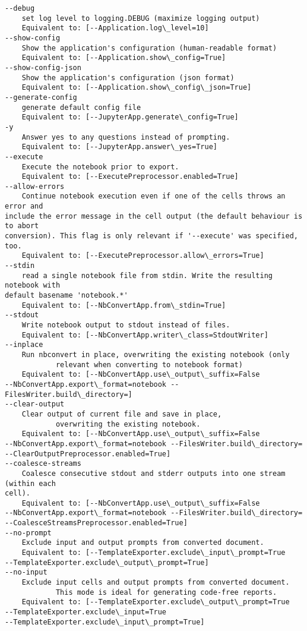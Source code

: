 \documentclass[11pt]{article}
\begin{document}
\begin{Verbatim}[commandchars=\\\{\}]
--debug
    set log level to logging.DEBUG (maximize logging output)
    Equivalent to: [--Application.log\_level=10]
--show-config
    Show the application's configuration (human-readable format)
    Equivalent to: [--Application.show\_config=True]
--show-config-json
    Show the application's configuration (json format)
    Equivalent to: [--Application.show\_config\_json=True]
--generate-config
    generate default config file
    Equivalent to: [--JupyterApp.generate\_config=True]
-y
    Answer yes to any questions instead of prompting.
    Equivalent to: [--JupyterApp.answer\_yes=True]
--execute
    Execute the notebook prior to export.
    Equivalent to: [--ExecutePreprocessor.enabled=True]
--allow-errors
    Continue notebook execution even if one of the cells throws an error and
include the error message in the cell output (the default behaviour is to abort
conversion). This flag is only relevant if '--execute' was specified, too.
    Equivalent to: [--ExecutePreprocessor.allow\_errors=True]
--stdin
    read a single notebook file from stdin. Write the resulting notebook with
default basename 'notebook.*'
    Equivalent to: [--NbConvertApp.from\_stdin=True]
--stdout
    Write notebook output to stdout instead of files.
    Equivalent to: [--NbConvertApp.writer\_class=StdoutWriter]
--inplace
    Run nbconvert in place, overwriting the existing notebook (only
            relevant when converting to notebook format)
    Equivalent to: [--NbConvertApp.use\_output\_suffix=False
--NbConvertApp.export\_format=notebook --FilesWriter.build\_directory=]
--clear-output
    Clear output of current file and save in place,
            overwriting the existing notebook.
    Equivalent to: [--NbConvertApp.use\_output\_suffix=False
--NbConvertApp.export\_format=notebook --FilesWriter.build\_directory=
--ClearOutputPreprocessor.enabled=True]
--coalesce-streams
    Coalesce consecutive stdout and stderr outputs into one stream (within each
cell).
    Equivalent to: [--NbConvertApp.use\_output\_suffix=False
--NbConvertApp.export\_format=notebook --FilesWriter.build\_directory=
--CoalesceStreamsPreprocessor.enabled=True]
--no-prompt
    Exclude input and output prompts from converted document.
    Equivalent to: [--TemplateExporter.exclude\_input\_prompt=True
--TemplateExporter.exclude\_output\_prompt=True]
--no-input
    Exclude input cells and output prompts from converted document.
            This mode is ideal for generating code-free reports.
    Equivalent to: [--TemplateExporter.exclude\_output\_prompt=True
--TemplateExporter.exclude\_input=True
--TemplateExporter.exclude\_input\_prompt=True]

\end{Verbatim}
\end{document}
